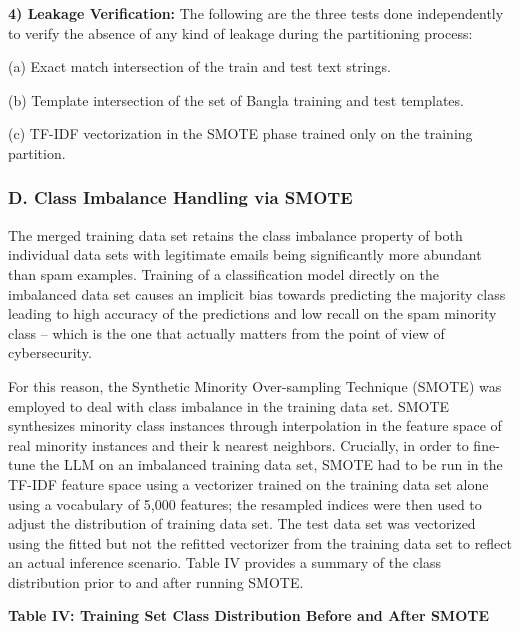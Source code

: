 \textbf{4) Leakage Verification:} The following are the three tests done
independently to verify the absence of any kind of leakage during the
partitioning process:

(a) Exact match intersection of the train and test text strings.

(b) Template intersection of the set of Bangla training and test
templates.

(c) TF-IDF vectorization in the SMOTE phase trained only on the training
partition.

\subsubsection{D. Class Imbalance Handling via
SMOTE}\label{d.-class-imbalance-handling-via-smote}

The merged training data set retains the class imbalance property of
both individual data sets with legitimate emails being significantly
more abundant than spam examples. Training of a classification model
directly on the imbalanced data set causes an implicit bias towards
predicting the majority class leading to high accuracy of the
predictions and low recall on the spam minority class -- which is the
one that actually matters from the point of view of cybersecurity.

For this reason, the Synthetic Minority Over-sampling Technique (SMOTE)
was employed to deal with class imbalance in the training data set.
SMOTE synthesizes minority class instances through interpolation in the
feature space of real minority instances and their k nearest neighbors.
Crucially, in order to fine-tune the LLM on an imbalanced training data
set, SMOTE had to be run in the TF-IDF feature space using a vectorizer
trained on the training data set alone using a vocabulary of 5,000
features; the resampled indices were then used to adjust the
distribution of training data set. The test data set was vectorized
using the fitted but not the refitted vectorizer from the training data
set to reflect an actual inference scenario. Table IV provides a summary
of the class distribution prior to and after running SMOTE.

\textbf{Table IV: Training Set Class Distribution Before and After
SMOTE}

